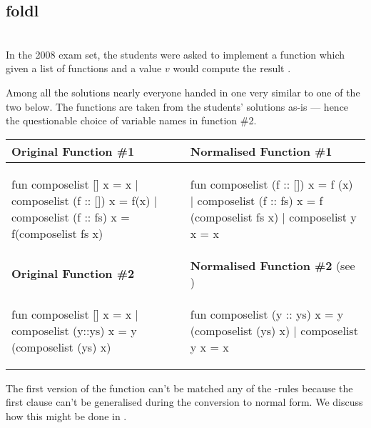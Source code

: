 \subsection{\textsf{foldl}}
\begin{example}\
  \label{ex:fold-instance-composelist}\\
  In the 2008 exam set, the students were asked to implement a 
  function which given a list of functions \ttt{[$f_1$, $f_2$, $\ldots$, $f_n$]}
  and a value $v$ would compute the result .

  Among all the solutions nearly everyone handed in one very similar to one of
  the two below. The functions are taken from the students' solutions as-is ---
  hence the questionable choice of variable names in function \#2.
  \begin{center}
    \begin{tabular}{|l|l|}
      \hline
      \textbf{Original Function \#1}
      & 
      \textbf{Normalised Function \#1}
      \\\hline
\begin{sml}
fun composelist [] x = x
  | composelist (f :: []) x = f(x)
  | composelist (f :: fs) x =
      f(composelist fs x)
\end{sml}
      &
\begin{sml}
fun composelist (f :: []) x = f (x)
  | composelist (f :: fs) x =
      f (composelist fs x)
  | composelist y x = x
\end{sml}
      \\\hline
      \textbf{Original Function \#2}
      &
      \textbf{Normalised Function \#2}
      \footnotesize{(see \fref{tr:trace-normalise-composelist})}
      \\\hline
\begin{sml}
fun composelist [] x = x
  | composelist (y::ys) x =
     y (composelist (ys) x)
\end{sml}
      &
\begin{sml}
fun composelist (y :: ys) x =
      y (composelist (ys) x)
  | composelist y x = x
\end{sml}
      \\\hline
    \end{tabular}
  \end{center}
  The first version of the  function can't be matched any of
  the -rules because the first clause can't be generalised during the
  conversion to normal form. We discuss how this might be done in
  \fref{sec:furth-gener}.


\end{example}
